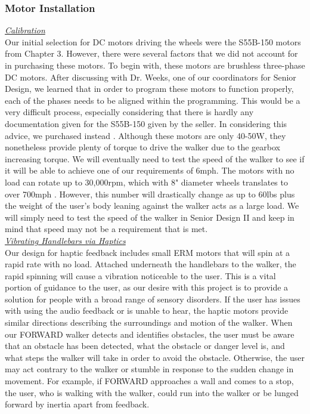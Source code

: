 \subsubsection{Motor Installation}
\noindent \underline{\textit{Calibration}}\\
\noindent Our initial selection for DC motors driving the wheels were the S55B-150 motors from Chapter 3. However, there were several factors that we did not account for in purchasing these motors. To begin with, these motors are brushless three-phase DC motors. After discussing with Dr. Weeks, one of our coordinators for Senior Design, we learned that in order to program these motors to function properly, each of the phases needs to be aligned within the programming. This would be a very difficult process, especially considering that there is hardly any documentation given for the S55B-150 given by the seller. In considering this advice, we purchased instead \cite{amazon12024}. Although these motors are only 40-50W, they nonetheless provide plenty of torque to drive the walker due to the gearbox increasing torque. We will eventually need to test the speed of the walker to see if it will be able to achieve one of our requirements of 6mph. The motors with no load can rotate up to 30,000rpm, which with 8" diameter wheels translates to over 700mph \cite{lucidar2024}. However, this number will drastically change as up to 60lbs plus the weight of the user's body leaning against the walker acts as a large load. We will simply need to test the speed of the walker in Senior Design II and keep in mind that speed may not be a requirement that is met.\\


\noindent \underline{\textit{Vibrating Handlebars via Haptics}}\\

\noindent Our design for haptic feedback includes small ERM motors that will spin at a rapid rate with no load. Attached underneath the handlebars to the walker, the rapid spinning will cause a vibration noticeable to the user. This is a vital portion of guidance to the user, as our desire with this project is to provide a solution for people with a broad range of sensory disorders. If the user has issues with using the audio feedback or is unable to hear, the haptic motors provide similar directions describing the surroundings and motion of the walker. When our FORWARD walker detects and identifies obstacles, the user must be aware that an obstacle has been detected, what the obstacle or danger level is, and what steps the walker will take in order to avoid the obstacle. Otherwise, the user may act contrary to the walker or stumble in response to the sudden change in movement. For example, if FORWARD approaches a wall and comes to a stop, the user, who is walking with the walker, could run into the walker or be lunged forward by inertia apart from feedback.\\ 

